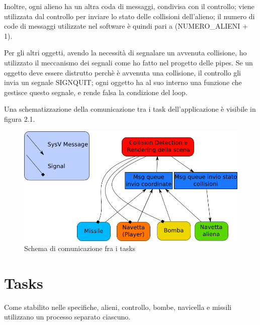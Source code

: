 \documentclass[a4paper,11pt]{report}
\begin{document}
Inoltre, ogni alieno ha un altra coda di messaggi, condivisa con il controllo; viene utilizzata dal controllo per inviare lo stato
delle collisioni dell'alieno; il numero di code di messaggi utilizzate nel software è quindi pari a (NUMERO_ALIENI + 1).

Per gli altri oggetti, avendo la necessità di segnalare un avvenuta collisione, ho utilizzato il
meccanismo dei segnali come ho fatto nel progetto delle pipes. Se un oggetto deve essere distrutto perchè è avvenuta una collisione, 
il controllo gli invia un segnale SIGNQUIT; ogni oggetto ha al suo interno una funzione che 
gestisce questo segnale, e rende falsa la condizione del loop.

Una schematizzazione della comunicazione tra i task dell'applicazione è visibile in figura 2.1.

\begin{center}
\begin{figure}
\begin{center}
\includegraphics[scale=0.50]{comunication.png}
\end{center}
\caption{Schema di comunicazione fra i tasks}
\end{figure}
\end{center}

\section{Tasks}
Come stabilito nelle specifiche, alieni, controllo, bombe, navicella e missili utilizzano
un processo separato ciascuno.
\end{document}
